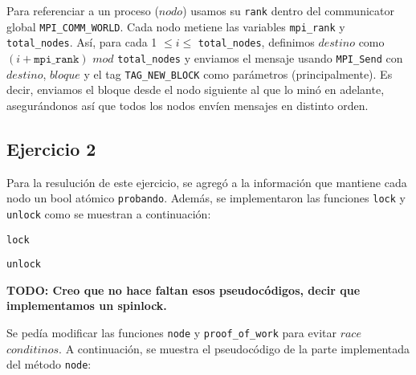 \documentclass[10pt, a4paper, hidelinks]{article}
\begin{document}
Para referenciar a un proceso ($nodo$) usamos su \texttt{rank} dentro del communicator global \texttt{MPI\_COMM\_WORLD}. Cada nodo metiene las variables \texttt{mpi\_rank} y \texttt{total\_nodes}. Así, para cada 1 $\leq i \leq$ \texttt{total\_nodes}, definimos $destino$ como $(i + \texttt{mpi\_rank})$ $mod$ \texttt{total\_nodes} y enviamos el mensaje usando \texttt{MPI\_Send} con $destino$, $bloque$ y el tag \texttt{TAG\_NEW\_BLOCK} como parámetros (principalmente). Es decir, enviamos el bloque desde el nodo siguiente al que lo minó en adelante, asegurándonos así que todos los nodos envíen mensajes en distinto orden.
 
\subsection{Ejercicio 2}
Para la resulución de este ejercicio, se agregó a la información que mantiene cada nodo un bool atómico \texttt{probando}. Además, se implementaron las funciones \texttt{lock} y \texttt{unlock} como se muestran a continuación:

\begin{algorithm}[H]
\SetAlgoLined
{}
\caption{\texttt{lock}}
\end{algorithm}

\begin{algorithm}[H]
\SetAlgoLined
{}
\caption{\texttt{unlock}}
\end{algorithm}

\textbf{TODO: Creo que no hace faltan esos pseudocódigos, decir que implementamos un spinlock.}

Se pedía modificar las funciones \texttt{node} y \texttt{proof\_of\_work} para evitar $race$ $conditinos$. A continuación, se muestra el pseudocódigo de la parte implementada del método \texttt{node}:
\end{document}
